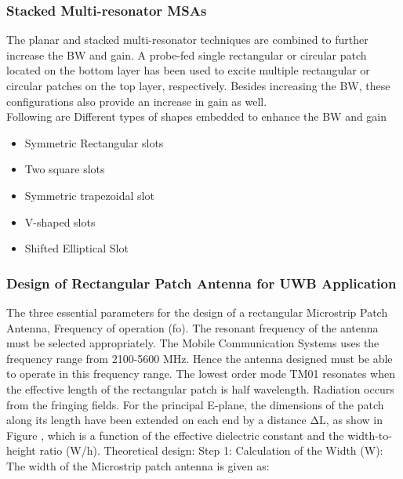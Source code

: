 \documentclass[12pt]{article}
\begin{document}
				            \subsubsection{ Stacked Multi-resonator MSAs}
				              \justify
				                The planar and stacked multi-resonator techniques are combined to further increase the BW and gain. A probe-fed single rectangular or circular patch located on the bottom layer has been used to excite multiple rectangular or circular patches on the top layer, respectively. Besides increasing the BW, these configurations also provide an increase in gain as well. \\
				                
				                \cleardoublepage
	   		                	Following are Different types of shapes embedded to enhance the BW and gain 
	   		                	
				                \begin{itemize}

				                	\item Symmetric Rectangular slots
				                	\item Two square slots 
				                	\item Symmetric trapezoidal slot 
				                	\item V-shaped slots
				                	\item Shifted Elliptical Slot
				                	
				                \end{itemize}
				               \subsubsection{ Design of  Rectangular Patch Antenna for UWB Application}
				                \justify
				                 The three essential parameters for the design of a rectangular Microstrip Patch Antenna, Frequency of operation (fo). The resonant frequency of the antenna must be selected appropriately. The Mobile Communication Systems uses the frequency range from 2100-5600 MHz. Hence the antenna designed must be able to operate in this frequency range. The lowest order mode TM01 resonates when the effective length of the rectangular patch is half wavelength. Radiation occurs from the fringing fields. For the principal E-plane, the dimensions of the patch along its length have been extended on each end by a distance ΔL, as show in Figure , which is a function of the effective dielectric constant and the width-to-height ratio (W/h).
				                 Theoretical design:
				                 Step 1: Calculation of the Width (W): 
				                 The width of the Microstrip patch antenna is given as: 
				                 					                                           
\end{document}
